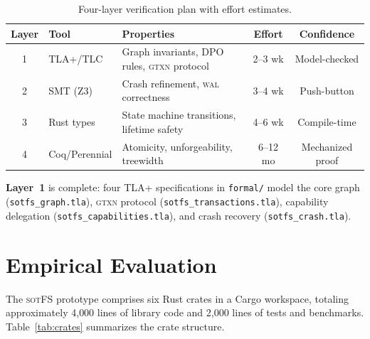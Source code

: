 \documentclass[11pt,a4paper]{article}
\theoremstyle{definition}
\newcommand{\sotfs}{\textsc{sotFS}}
\newcommand{\GTXN}{\textsc{gtxn}}
\newcommand{\WAL}{\textsc{wal}}
\begin{document}
\begin{table}[h]
\centering
\caption{Four-layer verification plan with effort estimates.}
\label{tab:verification}
\footnotesize
\begin{tabularx}{\textwidth}{c l X c c}
\toprule
\textbf{Layer} & \textbf{Tool} & \textbf{Properties} & \textbf{Effort} & \textbf{Confidence} \\
\midrule
1 & TLA+/TLC & Graph invariants, DPO rules, \GTXN{} protocol & 2--3 wk & Model-checked \\
2 & SMT (Z3) & Crash refinement, \WAL{} correctness & 3--4 wk & Push-button \\
3 & Rust types & State machine transitions, lifetime safety & 4--6 wk & Compile-time \\
4 & Coq/Perennial & Atomicity, unforgeability, treewidth & 6--12 mo & Mechanized proof \\
\bottomrule
\end{tabularx}
\end{table}

\textbf{Layer~1} is complete: four TLA+ specifications in \texttt{formal/}
model the core graph (\texttt{sotfs\_graph.tla}), \GTXN{} protocol
(\texttt{sotfs\_transactions.tla}), capability delegation
(\texttt{sotfs\_capabilities.tla}), and crash recovery
(\texttt{sotfs\_crash.tla}).

\section{Empirical Evaluation}\label{sec:evaluation}

The \sotfs{} prototype comprises six Rust crates in a Cargo workspace,
totaling approximately 4{,}000 lines of library code and 2{,}000 lines of
tests and benchmarks.  Table~\ref{tab:crates} summarizes the crate structure.
\end{document}
